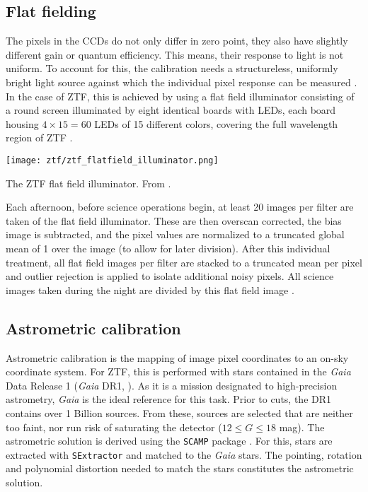 \subsection{Flat fielding}
The pixels in the CCDs do not only differ in zero point, they also have slightly different gain or quantum efficiency. This means, their response to light is not uniform. To account for this, the calibration needs a structureless, uniformly bright light source against which the individual pixel response can be measured \cite{Howell2006}. In the case of ZTF, this is achieved by using a flat field illuminator consisting of a round screen illuminated by eight identical boards with LEDs, each board housing $4\times15=60$ LEDs of 15 different colors, covering the full wavelength region of ZTF \cite{Dekany2020}.
\begin{marginfigure}
    \texttt{[image: ztf/ztf\_flatfield\_illuminator.png]}
    \caption[ZTF flat field illuminator]{The ZTF flat field illuminator. From \cite{Dekany2020}.}
\end{marginfigure}
Each afternoon, before science operations begin, at least 20 images per filter are taken of the flat field illuminator. These are then overscan corrected, the bias image is subtracted, and the pixel values are normalized to a truncated global mean of 1 over the image (to allow for later division). After this individual treatment, all flat field images per filter are stacked to a truncated mean per pixel and outlier rejection is applied to isolate additional noisy pixels. All science images taken during the night are divided by this flat field image \cite{Masci2019a}.

\subsection{Astrometric calibration}
Astrometric calibration is the mapping of image pixel coordinates to an on-sky coordinate system. For ZTF, this is performed with stars contained in the \textit{Gaia} Data Release 1 (\textit{Gaia} DR1, ). As it is a mission designated to high-precision astrometry, \textit{Gaia} is the ideal reference for this task. Prior to cuts, the DR1 contains over 1 Billion sources. From these, sources are selected that are neither too faint, nor run risk of saturating the detector ($12 \leq G \leq 18$ mag). The astrometric solution is derived using the \texttt{SCAMP}  package . For this, stars are extracted with \texttt{SExtractor}  and matched to the \textit{Gaia} stars. The pointing, rotation and polynomial distortion needed to match the stars constitutes the astrometric solution.

